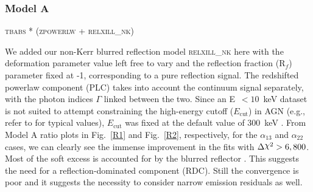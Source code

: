 \documentclass[aps,prd,twocolumn,superscriptaddress,nofootinbib,amsmath,amssymb]{revtex4-1}
\DeclareRobustCommand{\rchi}{{\mathpalette\irchi\relax}}
\newcommand{\irchi}[2]{\raisebox{\depth}{$#1\chi$}} %
\begin{document}
\subsubsection{Model A}\label{ModA}
\begin{center}
\textsc{tbabs * (zpowerlw + relxill\_nk)}
\end{center}

We added our non-Kerr blurred reflection model \textsc{relxill\_nk} here with the deformation parameter value left free to vary and the reflection fraction (R$_f$) parameter fixed at -1, corresponding to a pure reflection signal. The redshifted powerlaw component (PLC) takes into account the continuum signal separately, with the photon indices $\Gamma$ linked between the two.
Since an E~$<10$~keV dataset  is not suited to attempt constraining the high-energy cutoff ($E_{\textrm{cut}}$) in AGN (e.g., refer to \citep{Tortosa2018} for typical values), $E_{\textrm{cut}}$ was fixed at the default value of 300~keV \citep{Keek2016}. From Model A ratio plots in Fig.~\ref{R1} and Fig.~\ref{R2}, respectively, for the $\alpha_{13}$ and $\alpha_{22}$ cases, we can clearly see the immense improvement in the fits with $\Delta\rchi^2 > 6,800$. Most of the soft excess is accounted for by the blurred reflector \citep{Miller2007}. This suggests the need for a reflection-dominated component (RDC). Still the convergence is poor and it suggests the necessity to consider narrow emission residuals as well.


\end{document}
